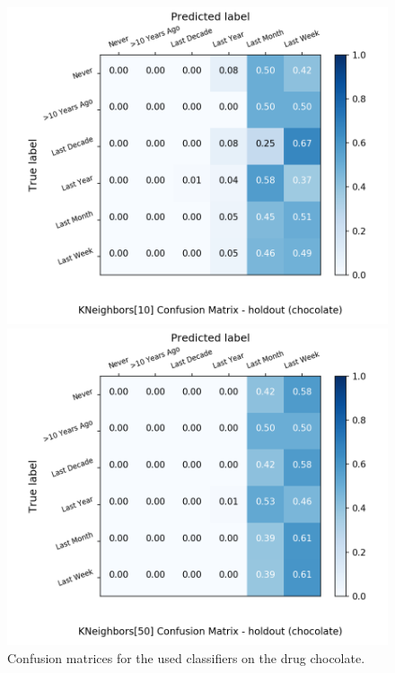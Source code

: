 \begin{figure}[H]
\begin{minipage}[b]{0.32\textwidth}
		\includegraphics[width=1.1\textwidth]{Plots/chocolate_KNeighbors_10_balance_False_holdout.png}
  \end{minipage}
	\begin{minipage}[b]{0.32\textwidth}
		\includegraphics[width=1.1\textwidth]{Plots/chocolate_KNeighbors_50_balance_False_holdout.png}
  \end{minipage}
	\caption{Confusion matrices for the used classifiers on the drug chocolate.}
\end{figure}

